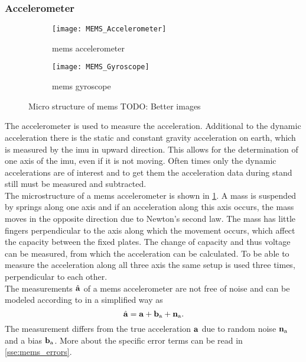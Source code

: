 \subsubsection{ Accelerometer}
\begin{figure}[htb]
    \centering
    \begin{subfigure}{0.48\textwidth}
        \centering
        \texttt{[image: MEMS\_Accelerometer]}
        \caption{\acrshort{mems} accelerometer}
        \label{fig:MEMS_Accelerometer}
    \end{subfigure}
    \begin{subfigure}{0.48\textwidth}
        \centering
        \texttt{[image: MEMS\_Gyroscope]}
        \caption{\acrshort{mems} gyroscope}
        \label{fig:MEMS_Gyroscope}
    \end{subfigure}
    \caption{Micro structure of \acrshort{mems} TODO: Better images}
    \label{fig:MEMS_design}
\end{figure}
The accelerometer is used to measure the acceleration.
Additional to the dynamic acceleration there is the static and constant gravity acceleration on earth, which is measured by the \gls{imu} in upward direction.
This allows for the determination of one axis of the \gls{imu}, even if it is not moving.
Often times only the dynamic accelerations are of interest and to get them the acceleration data during stand still must be measured and subtracted.\\
The microstructure of a \gls{mems} accelerometer is shown in \cref{fig:MEMS_Accelerometer}.
A mass is suspended by springs along one axis and if an acceleration along this axis occurs, the mass moves in the opposite direction due to Newton's second law.
The mass has little fingers perpendicular to the axis along which the movement occurs, which affect the capacity between the fixed plates.
The change of capacity and thus voltage can be measured, from which the acceleration can be calculated.
To be able to measure the acceleration along all three axis the same setup is used three times, perpendicular to each other.\\
The measurements $\hat{\vb{a}}$ of a \gls{mems} accelerometer are not free of noise and can be modeled according to \cite{Lefferts1982} in a simplified way as
\begin{equation}
    \hat{\vb{a}} = \vb{a} + \vb{b}_\mathrm{a} + \vb{n}_\mathrm{a}.
\end{equation}
The measurement differs from the true acceleration $\vb{a}$ due to random noise $\vb{n}_\mathrm{a}$ and a bias $\vb{b}_\mathrm{a}$.
More about the specific error terms can be read in \cref{sse:mems_errors}.

